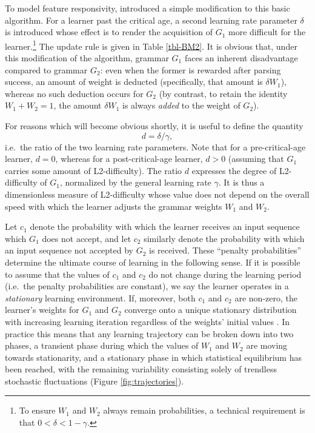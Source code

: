 To model feature responsivity, \textcite{Kauhanen2022} introduced a
simple modification to this basic algorithm. For a learner past the
critical age, a second learning rate parameter \(\delta\) is introduced
whose effect is to render the acquisition of \(G_1\) more difficult for
the learner.\footnote{To ensure \(W_1\) and \(W_2\) always remain
  probabilities, a technical requirement is that
  \(0 < \delta < 1 - \gamma\).} The update rule is given in Table
\ref{tbl-BM2}. It is obvious that, under this modification of the
algorithm, grammar \(G_1\) faces an inherent disadvantage compared to
grammar \(G_2\): even when the former is rewarded after parsing success,
an amount of weight is deducted (specifically, that amount is
\(\delta W_1\)), whereas no such deduction occurs for \(G_2\) (by
contrast, to retain the identity \(W_1 + W_2 = 1\), the amount
\(\delta W_1\) is always \emph{added} to the weight of \(G_2\)).

For reasons which will become obvious shortly, it is useful to define
the quantity \begin{equation}
d = \delta / \gamma,
\label{eq:definition-of-d}\end{equation} i.e.~the ratio of the two
learning rate parameters. Note that for a pre-critical-age learner,
\(d = 0\), whereas for a post-critical-age learner, \(d > 0\) (assuming
that \(G_1\) carries some amount of L2-difficulty). The ratio \(d\)
expresses the degree of L2-difficulty of \(G_1\), normalized by the
general learning rate \(\gamma\). It is thus a dimensionless measure of
L2-difficulty whose value does not depend on the overall speed with
which the learner adjusts the grammar weights \(W_1\) and \(W_2\).

Let \(c_1\) denote the probability with which the learner receives an
input sequence which \(G_1\) does not accept, and let \(c_2\) similarly
denote the probability with which an input sequence not accepted by
\(G_2\) is received. These ``penalty probabilities'' \autocite{Yang2000}
determine the ultimate course of learning in the following sense. If it
is possible to assume that the values of \(c_1\) and \(c_2\) do not
change during the learning period (i.e.~the penalty probabilities are
constant), we say the learner operates in a \emph{stationary} learning
environment. If, moreover, both \(c_1\) and \(c_2\) are non-zero, the
learner's weights for \(G_1\) and \(G_2\) converge onto a unique
stationary distribution with increasing learning iteration regardless of
the weights' initial values
\autocite{BushMosteller1955,NarendraThathachar1989}. In practice this
means that any learning trajectory can be broken down into two phases, a
transient phase during which the values of \(W_1\) and \(W_2\) are
moving towards stationarity, and a stationary phase in which statistical
equilibrium has been reached, with the remaining variability consisting
solely of trendless stochastic fluctuations (Figure
\ref{fig:trajectories}).

